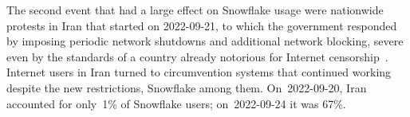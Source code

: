 \documentclass[letterpaper,twocolumn]{article}
\begin{document}
The second event that had a large effect on Snowflake usage
were nationwide protests in Iran that started on \mbox{2022-09-21},
to which the government responded by imposing periodic network shutdowns
and additional network blocking,
severe even by the standards of a country already notorious
for Internet censorship~\cite{ooni-2022-iran-blocks-social-media-mahsa-amini-protests}.
Internet users in Iran turned to circumvention systems
that continued working despite the new restrictions,
Snowflake among them.
On~\mbox{2022-09-20}, Iran accounted for only~1\% of Snowflake users;
on~\mbox{2022-09-24} it was 67\%.
\end{document}
